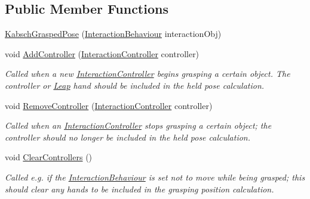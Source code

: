 \subsection*{Public Member Functions}
\begin{DoxyCompactItemize}
\item 
\mbox{\hyperlink{class_leap_1_1_unity_1_1_interaction_1_1_kabsch_grasped_pose_aa01fe24ea822fcb0e2a99511dd617ab6}{Kabsch\+Grasped\+Pose}} (\mbox{\hyperlink{class_leap_1_1_unity_1_1_interaction_1_1_interaction_behaviour}{Interaction\+Behaviour}} interaction\+Obj)
\item 
void \mbox{\hyperlink{class_leap_1_1_unity_1_1_interaction_1_1_kabsch_grasped_pose_a48e190a6d9cadcaf3340d339ac61d464}{Add\+Controller}} (\mbox{\hyperlink{class_leap_1_1_unity_1_1_interaction_1_1_interaction_controller}{Interaction\+Controller}} controller)
\begin{DoxyCompactList}\small\item\em Called when a new \mbox{\hyperlink{class_leap_1_1_unity_1_1_interaction_1_1_interaction_controller}{Interaction\+Controller}} begins grasping a certain object. The controller or \mbox{\hyperlink{namespace_leap_1_1_unity_1_1_leap}{Leap}} hand should be included in the held pose calculation. \end{DoxyCompactList}\item 
void \mbox{\hyperlink{class_leap_1_1_unity_1_1_interaction_1_1_kabsch_grasped_pose_a661d3ea1067114b90addbc885691c899}{Remove\+Controller}} (\mbox{\hyperlink{class_leap_1_1_unity_1_1_interaction_1_1_interaction_controller}{Interaction\+Controller}} controller)
\begin{DoxyCompactList}\small\item\em Called when an \mbox{\hyperlink{class_leap_1_1_unity_1_1_interaction_1_1_interaction_controller}{Interaction\+Controller}} stops grasping a certain object; the controller should no longer be included in the held pose calculation. \end{DoxyCompactList}\item 
void \mbox{\hyperlink{class_leap_1_1_unity_1_1_interaction_1_1_kabsch_grasped_pose_a016fe0af189b4caae24050a70b4d2462}{Clear\+Controllers}} ()
\begin{DoxyCompactList}\small\item\em Called e.\+g. if the \mbox{\hyperlink{class_leap_1_1_unity_1_1_interaction_1_1_interaction_behaviour}{Interaction\+Behaviour}} is set not to move while being grasped; this should clear any hands to be included in the grasping position calculation. \end{DoxyCompactList}\item 

\end{DoxyCompactItemize}
